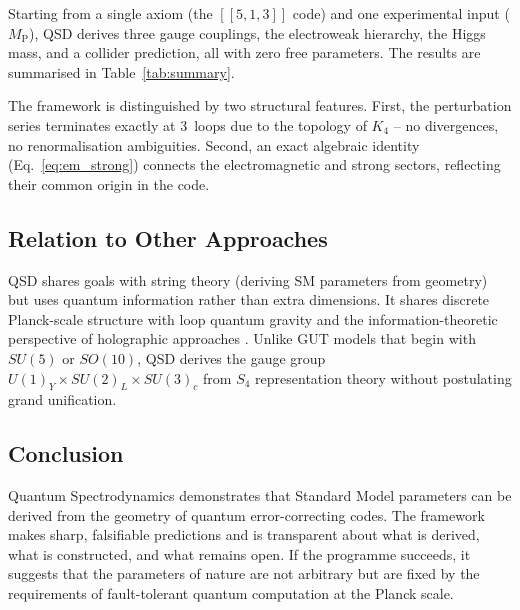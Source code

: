 \documentclass[11pt,a4paper]{article}
\theoremstyle{definition}
\newcommand{\Mpl}{M_{\mathrm{P}}}
\begin{document}
Starting from a single axiom (the $[[5,1,3]]$ code) and one experimental input ($\Mpl$), QSD derives three gauge couplings, the electroweak hierarchy, the Higgs mass, and a collider prediction, all with zero free parameters. The results are summarised in Table~\ref{tab:summary}.

The framework is distinguished by two structural features. First, the perturbation series terminates exactly at 3~loops due to the topology of $K_4$ -- no divergences, no renormalisation ambiguities. Second, an exact algebraic identity (Eq.~\ref{eq:em_strong}) connects the electromagnetic and strong sectors, reflecting their common origin in the code.

\subsection{Relation to Other Approaches}

QSD shares goals with string theory (deriving SM parameters from geometry) but uses quantum information rather than extra dimensions. It shares discrete Planck-scale structure with loop quantum gravity and the information-theoretic perspective of holographic approaches \cite{Almheiri2015,Pastawski2015}. Unlike GUT models that begin with $SU(5)$ or $SO(10)$, QSD derives the gauge group $U(1)_Y \times SU(2)_L \times SU(3)_c$ from $S_4$ representation theory without postulating grand unification.

\subsection{Conclusion}

Quantum Spectrodynamics demonstrates that Standard Model parameters can be derived from the geometry of quantum error-correcting codes. The framework makes sharp, falsifiable predictions and is transparent about what is derived, what is constructed, and what remains open. If the programme succeeds, it suggests that the parameters of nature are not arbitrary but are fixed by the requirements of fault-tolerant quantum computation at the Planck scale.

\newpage



\newpage
\appendix
\end{document}

